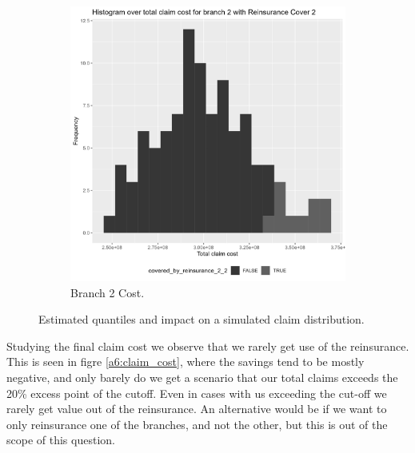 \documentclass[11pt]{article}
\begin{document}
\begin{figure}[!h]
\begin{subfigure}{.24\textwidth}
    \end{subfigure}
    \begin{subfigure}{.24\textwidth}
      \centering
      \includegraphics[width=.9\linewidth]{plots/reinsurance2/histogram_total_claim_cost_reinsurance2_2.png}
      \caption{Branch 2 Cost.}
    \end{subfigure}
    \caption{Estimated quantiles and impact on a simulated claim distribution.}
    \label{a6:simulation}
\end{figure}

Studying the final claim cost we observe that we rarely get use of the reinsurance.
This is seen in figre \ref{a6:claim_cost}, where the savings tend to be mostly negative, and only barely do we get a scenario that our total claims exceeds the 20\% excess point of the cutoff.
Even in cases with us exceeding the cut-off we rarely get value out of the reinsurance.
An alternative would be if we want to only reinsurance one of the branches, and not the other, but this is out of the scope of this question.
\end{document}
